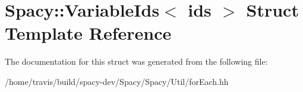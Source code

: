 \hypertarget{structSpacy_1_1VariableIds}{\section{Spacy\-:\-:Variable\-Ids$<$ ids $>$ Struct Template Reference}
\label{structSpacy_1_1VariableIds}
}


The documentation for this struct was generated from the following file\-:\begin{DoxyCompactItemize}
\item 
/home/travis/build/spacy-\/dev/\-Spacy/\-Spacy/\-Util/for\-Each.\-hh\end{DoxyCompactItemize}
